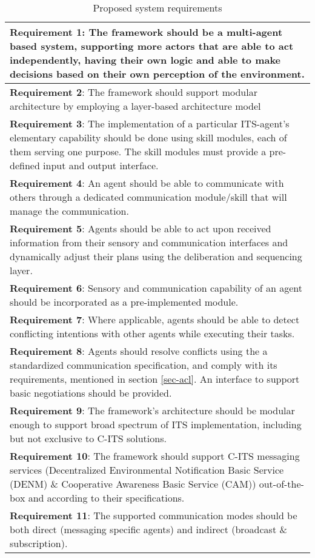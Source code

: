 \documentclass[main.tex]{subfiles}
\begin{document}
\begin{table}[htbp]
    \small
    \caption{Proposed system requirements}
    \centering\begin{tabular}{>{\footnotesize}p{}}
        \toprule 
\textbf{Requirement 1}: The framework should be a multi-agent based system, supporting more actors 
that are able to act independently, having their own logic and able to make decisions based on their 
own perception of the environment.
\\ \midrule
\textbf{Requirement 2}: The framework should support modular architecture by employing a layer-based 
architecture model
\\ \midrule
\textbf{Requirement 3}: The implementation of a particular ITS-agent's elementary
capability should be done using skill modules, each of them serving one purpose. The skill modules must provide a
pre-defined input and output interface.
\\ \midrule
\textbf{Requirement 4}: An agent should be able to communicate with others through a dedicated communication module/skill 
that will manage the communication.
\\ \midrule
\textbf{Requirement 5}: Agents should be able to act upon received information from their sensory and communication interfaces
and dynamically adjust their plans using the deliberation and sequencing layer.
\\ \midrule
\textbf{Requirement 6}: Sensory and communication capability of an agent should be incorporated 
as a pre-implemented module.
\\ \midrule
\textbf{Requirement 7}: Where applicable, agents should be able to detect conflicting intentions with other agents
while executing their tasks. 
\\ \midrule
\textbf{Requirement 8}: Agents should resolve conflicts using the a standardized communication
specification, and comply with its requirements, mentioned in section \ref{sec-acl}. An
interface to support basic negotiations should be provided.
\\ \midrule
\textbf{Requirement 9}: The framework's architecture should be modular enough to support broad 
spectrum of ITS implementation, including but not exclusive to C-ITS solutions.
\\ \midrule
\textbf{Requirement 10}: The framework should support C-ITS messaging services (Decentralized
Environmental Notification Basic Service (DENM) \& Cooperative Awareness Basic Service (CAM))
out-of-the-box and according to their specifications.
\\ \midrule
\textbf{Requirement 11}: The supported communication modes should be both direct (messaging specific agents) and indirect  
(broadcast \& subscription). 
\\ \bottomrule
    \end{tabular}
    \label{sys-requirements}
\end{table}

\clearpage
\end{document}
